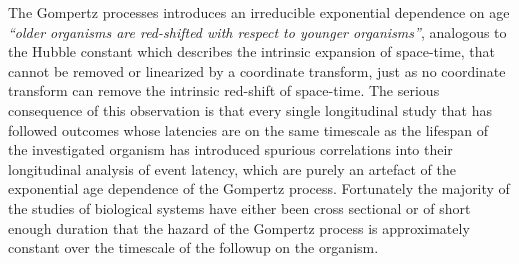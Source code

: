 \documentclass{article}
\theoremstyle{definition}\newtheorem{definition}{Definition}
\begin{document}
  The Gompertz processes introduces an irreducible exponential dependence on age
  \emph{``older organisms are red-shifted with respect to younger organisms''}, analogous to
  the Hubble constant which describes the intrinsic expansion of space-time, that cannot be
  removed or linearized by a coordinate transform, just as no coordinate transform can
  remove the intrinsic red-shift of space-time. The serious consequence of this observation
  is that every single longitudinal study that has followed outcomes whose latencies are on
  the same timescale as the lifespan of the investigated organism has introduced spurious
  correlations into their longitudinal analysis of event latency, which are purely an
  artefact of the exponential age dependence of the Gompertz process. Fortunately the
  majority of the studies of biological systems have either been cross sectional or of short
  enough duration that the hazard of the Gompertz process is approximately constant over the
  timescale of the followup on the organism.
\end{document}
